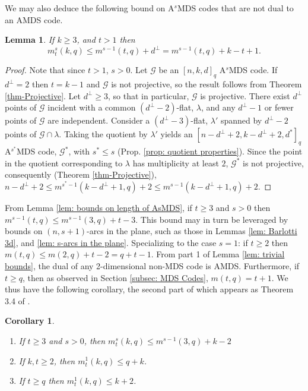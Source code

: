 \documentclass[11pt,a4paper]{amsart}
\newcommand{\AS}{ A$^s$MDS }
\newcommand{\G}{\mathcal{G}}
\theoremstyle{plain}
\newtheorem{lemma}[theorem]{Lemma}
\newtheorem{corollary}[theorem]{Corollary}
\theoremstyle{definition}
\theoremstyle{remark}
\begin{document}
	We may also deduce the following bound on \AS codes that are not dual to an AMDS code.

	\begin{lemma} \label{lem: bounds based on d perp}
		If $k\ge 3$, and $t>1$ then
		\[
		m^s_t(k,q)\le m^{s-1}(t,q)+d^\perp = m^{s-1}(t,q)+k-t+1.
		\]
	\end{lemma}
	\begin{proof}
		Note that since $t>1$, $s>0$. Let $\G$ be an $[n,k,d]_q$ \AS code. If $d^\perp=2$ then $t=k-1$ and $\G$ is not projective, so the result follows from Theorem \ref{thm-Projective}.  Let $d^\perp \ge 3$, so that in particular, $\G$ is projective. There exist $d^\perp$ points of $\G$ incident with a common $(d^\perp-2)$-flat, $\lambda$, and any $d^\perp-1$ or fewer points of $\G$ are independent. Consider a $(d^\perp-3)$-flat, $\lambda'$  spanned by $d^\perp-2$ points of $\G\cap \lambda$. Taking the quotient by $\lambda'$ yields  an $[n-d^\perp+2,k-d^\perp+2,d^*]_q$ A$^{s^*}$MDS code, $\G^*$, with  $s^*\le s$ (Prop. \ref{prop: quotient properties}). Since the point in the quotient corresponding to $\lambda$ has multiplicity at least $2$, $\G^*$ is not projective, consequently (Theorem \ref{thm-Projective}),   $n-d^\perp+2\le m^{s^*-1}(k-d^\perp+1,q)+2\le m^{s-1}(k-d^\perp+1,q)+2$.
	\end{proof}

	From Lemma \ref{lem: bounds on length of AsMDS},  if $t\ge 3$ and $s>0$ then $m^{s-1}(t,q)\le m^{s-1}(3,q)+t-3$. This bound may in turn be leveraged by bounds on $(n,s+1)$-arcs in the plane, such as those in Lemmas \ref{lem: Barlotti 3d}, and \ref{lem: s-arcs in the plane}.
	Specializing to the case $s=1$: if $t\ge 2$ then $m(t,q)\le m(2,q)+t-2=q+t-1$. From part 1 of Lemma \ref{lem: trivial bounds}, the dual of any 2-dimensional non-MDS code is AMDS. Furthermore, if $t\ge q$, then as observed in Section \ref{subsec: MDS Codes}, $m(t,q)=t+1$.  We thus have the following corollary, the second part of which appears as Theorem 3.4 of \cite{MR1358272}.

	\begin{corollary} \label{cor: bound s = 1 t>1}  \leavevmode \vspace*{-2mm}
		\begin{enumerate}
			\item If $t\ge 3$ and $s>0$, then $m^s_t(k,q)\le m^{s-1}(3,q)+k-2 $
			\item If $k,t\ge 2$, then  $m^1_t(k,q)\le q+k$.
			\item If $t\ge q$ then  $m^1_t(k,q)\le k+2$.
		\end{enumerate}
	\end{corollary}
\end{document}
